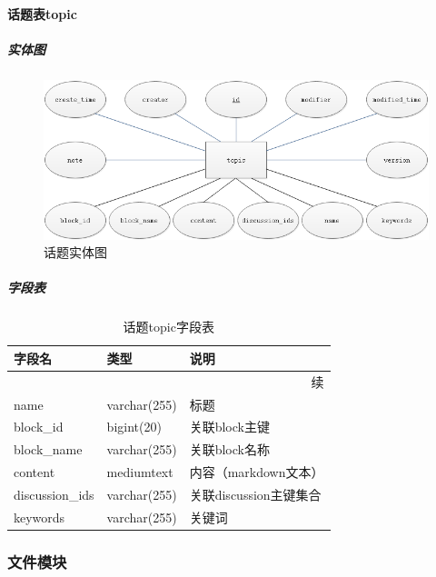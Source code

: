 \documentclass[titlepage,UTF8,linespread=1.5]{ctexart}
\begin{document}
\paragraph{话题表topic}
\subparagraph{实体图}
\begin{figure}[H]
    \centering
    \includegraphics[width=140mm]{entity-topic.png}
    \caption{话题实体图}
    \label{fig:entity-topic}
\end{figure}
\subparagraph{字段表}
\begin{longtable}{|p{10em}|p{6em}|p{15em}|}
    \caption{话题topic字段表}\label{tab:table_topic}        \\\hline
    字段名          & 类型         & 说明                   \\\hline
    \endfirsthead
    \multicolumn{3}{r}{{续\tablename\thetable{}}}           \\\hline
    \endhead
    name            & varchar(255) & 标题                   \\\hline
    block\_id       & bigint(20)   & 关联block主键          \\\hline
    block\_name     & varchar(255) & 关联block名称          \\\hline
    content         & mediumtext   & 内容（markdown文本）   \\\hline
    discussion\_ids & varchar(255) & 关联discussion主键集合 \\\hline
    keywords        & varchar(255) & 关键词                 \\\hline
\end{longtable}\par

\subsubsection{文件模块}
\end{document}
